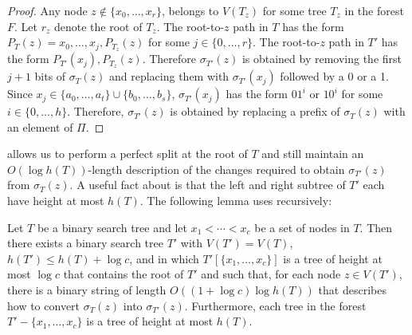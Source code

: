 \documentclass[kpfonts]{patmorin}
\begin{document}
\begin{proof}
Any node $z\not\in\{x_0,\ldots,x_r\}$, belongs to $V(T_z)$ for some tree $T_z$ in the forest $F$.  Let $r_z$ denote the root of $T_z$.  The root-to-$z$ path in $T$ has the form $P_{T}(z)=x_0,\ldots,x_j,P_{T_z}(z)$ for some $j\in\{0,\ldots,r\}$.  The root-to-$z$ path in $T'$ has the form $P_{T'}(x_j),P_{T_z}(z)$.  Therefore $\sigma_{T'}(z)$ is obtained by removing the first $j+1$ bits of $\sigma_T(z)$ and replacing them with $\sigma_{T'}(x_j)$ followed by a 0 or a 1.  Since $x_j\in\{a_0,\ldots,a_t\}\cup\{b_0,\ldots,b_s\}$, $\sigma_{T'}(x_j)$ has the form $01^i$ or $10^i$ for some $i\in\{0,\ldots,h\}$.  Therefore, $\sigma_{T'}(z)$ is obtained by replacing a prefix of $\sigma_T(z)$ with an element of $\Pi$.
\end{proof}

 allows us to perform a perfect split at the root of $T$ and still maintain an $O(\log h(T))$-length description of the changes required to obtain $\sigma_{T'}(z)$ from $\sigma_T(z)$.  A useful fact about  is that the left and right subtree of $T'$ each have height at most $h(T)$.
The following lemma uses  recursively:

\begin{lem}
  Let $T$ be a binary search tree and let $x_1<\cdots<x_c$ be a set of nodes in $T$. Then there exists a binary search tree $T'$ with $V(T')=V(T)$, $h(T')\le h(T)+\log c$, and in which $T'[\{x_1,\ldots,x_c\}]$ is a tree of height at most $\log c$ that contains the root of $T'$ and such that, for each node $z\in V(T')$, there is a binary string of length $O((1+\log c)\log h(T))$ that describes how to convert $\sigma_T(z)$ into $\sigma_{T'}(z)$.  Furthermore, each tree in the forest $T'-\{x_1,\ldots,x_c\}$ is a tree of height at most $h(T)$.
\end{lem}
\end{document}
